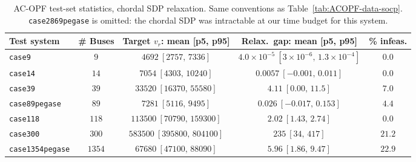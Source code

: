 \documentclass[10pt]{article} %
\theoremstyle{plain}
\theoremstyle{definition}
\theoremstyle{remark}
\begin{document}
\begin{table}[H]
\centering
\footnotesize
\caption{AC-OPF test-set statistics, chordal SDP relaxation. Same conventions as Table~\ref{tab:ACOPF-data-socp}. \texttt{case2869pegase} is omitted: the chordal SDP was intractable at our time budget for this system.}
\begin{tabular}{lcccc}
\toprule
\textbf{Test system} & \textbf{\# Buses} & \textbf{Target } $v_r$\textbf{: mean [p5, p95]} & \textbf{Relax.\ gap: mean [p5, p95]} & \textbf{\% infeas.} \\
\midrule
\texttt{case9}          & $9$    & $4692\ [2757,\,7336]$        & $4.0\!\times\!10^{-5}\ [3\!\times\!10^{-6},\,1.3\!\times\!10^{-4}]$ & $0.0$ \\
\texttt{case14}         & $14$   & $7054\ [4303,\,10240]$       & $0.0057\ [-0.001,\,0.011]$ & $0.0$ \\
\texttt{case39}         & $39$   & $33520\ [16370,\,55580]$     & $4.11\ [0.00,\,11.5]$      & $7.0$ \\
\texttt{case89pegase}   & $89$   & $7281\ [5116,\,9495]$        & $0.026\ [-0.017,\,0.153]$  & $4.4$ \\
\texttt{case118}        & $118$  & $113500\ [70790,\,159300]$   & $2.02\ [1.43,\,2.74]$      & $0.0$ \\
\texttt{case300}        & $300$  & $583500\ [395800,\,804100]$  & $235\ [34,\,417]$          & $21.2$ \\
\texttt{case1354pegase} & $1354$ & $67680\ [47100,\,88090]$     & $5.96\ [1.86,\,9.47]$      & $22.9$ \\
\bottomrule
\end{tabular}
\label{tab:ACOPF-data-chordal}
\end{table}
\end{document}
